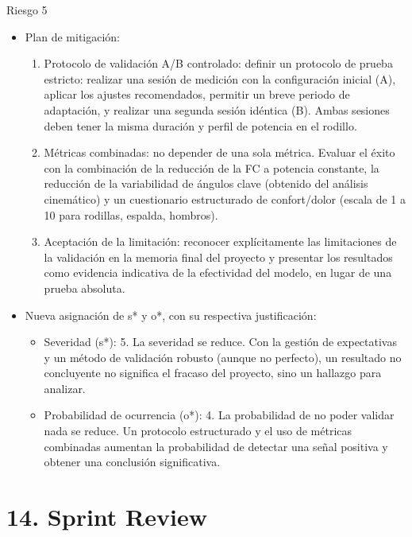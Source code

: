 \documentclass[
11pt, %
]{charter}
\begin{document}
Riesgo 5
\begin{itemize}
    \item Plan de mitigación:
    \begin{enumerate}
        \item Protocolo de validación A/B controlado: definir un protocolo de prueba estricto: realizar una sesión de medición con la configuración inicial (A), aplicar los ajustes recomendados, permitir un breve periodo de adaptación, y realizar una segunda sesión idéntica (B). Ambas sesiones deben tener la misma duración y perfil de potencia en el rodillo.
        \item Métricas combinadas: no depender de una sola métrica. Evaluar el éxito con la combinación de la reducción de la FC a potencia constante, la reducción de la variabilidad de ángulos clave (obtenido del análisis cinemático) y un cuestionario estructurado de confort/dolor (escala de 1 a 10 para rodillas, espalda, hombros).
        \item Aceptación de la limitación: reconocer explícitamente las limitaciones de la validación en la memoria final del proyecto y presentar los resultados como evidencia indicativa de la efectividad del modelo, en lugar de una prueba absoluta.
    \end{enumerate}
    \item Nueva asignación de s* y o*, con su respectiva justificación:
    \begin{itemize}
        \item Severidad (s*): 5. La severidad se reduce. Con la gestión de expectativas y un método de validación robusto (aunque no perfecto), un resultado no concluyente no significa el fracaso del proyecto, sino un hallazgo para analizar.
        \item Probabilidad de ocurrencia (o*): 4. La probabilidad de no poder validar nada se reduce. Un protocolo estructurado y el uso de métricas combinadas aumentan la probabilidad de detectar una señal positiva y obtener una conclusión significativa.
    \end{itemize}
\end{itemize}

\section{14. Sprint Review}
\label{sec:sprint_review}
\end{document}

